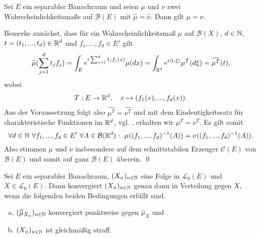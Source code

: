 \begin{theorem}[Eindeutigkeitssatz]
    Sei $E$ ein separabler Banachraum und seien $\mu$ und $\nu$ zwei Wahrscheinlichkeitsmaße auf $\mathcal{B}(E)$ mit $\widehat{\mu} = \widehat{\nu}$. Dann gilt $\mu = \nu$.
\end{theorem}

\begin{proof*}
    Bemerke zunächst, dass für ein Wahrscheinlichkeitsmaß $\mu$ auf $\mathcal{B}(X)$, $d \in  \mathbb{N}$, $t=(t_1,...,t_d) \in \mathbb{R}^d$ und $f_1,..., f_d \in E'$ gilt
    $$
        \widehat{\mu}(\sum_{j=1}^d t_j f_j) = \int_E e^{i\sum_{j=1}^dt_jf_j(x)}\mu(dx) = \int_{\mathbb{R}^d} e^{i\langle t, \xi \rangle}\mu^T(d\xi) = \widehat{\mu^T}(t),
    $$
    wobei 
    $$
        T: E \to \mathbb{R}^d, \quad x \mapsto (f_1(x),...,f_d(x)). 
    $$
    Aus der Voraussetzung folgt also $\widehat{\mu^T} = \widehat{\nu^T}$ und mit dem Eindeutigkeitssatz für charakteristische Funktionen im $\mathbb{R}^d$, vgl. \cite[Satz 8.7.1]{gs}, erhalten wir $\mu^T = \nu^T$. 
    Es gilt somit
    $$
        \forall d\in \N \ \forall f_1,...,f_d \in E' \ \forall A \in \mathcal{B}(\R^d): \ \mu((f_1,...,f_d)^{-1}(A)) =  \nu((f_1,...,f_d)^{-1}(A)). 
    $$
    Also stimmen $\mu$ und $\nu$ insbesondere auf dem schnittstabilen Erzeuger $\mathcal{C}(E)$ von $\mathcal{B}(E)$ und somit auf ganz $\mathcal{B}(E)$ überein. \qed
\end{proof*}

\begin{theorem}
    Sei  $E$ ein separabler Banachraum, $(X_n)_{n \in \mathbb{N}}$ eine Folge in $\mathcal{L}_0(E)$ und $X \in \mathcal{L}_0(E)$. 
    Dann konvergiert $(X_n)_{n \in \mathbb{N}}$ genau dann in Verteilung gegen $X$, wenn die folgenden beiden Bedingungen erfüllt sind.
    \begin{enumerate}[(a)]
        \item $(\widehat{\mu}_{X_n})_{n \in \mathbb{N}}$ konvergiert punktweise gegen $\widehat{\mu}_X$ und
        \item $(X_n)_{n \in \mathbb{N}}$ ist gleichmäßig straff. 
    \end{enumerate}
\end{theorem}

